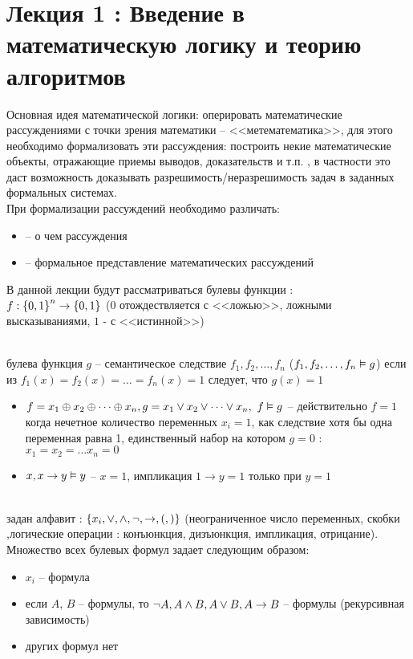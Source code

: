 \section{Лекция 1 : Введение в математическую логику и теорию алгоритмов}
\noindent Основная идея математической логики: оперировать математические рассуждениями с точки зрения математики -- <<метематематика>>, для этого необходимо формализовать эти рассуждения: построить некие математические объекты, отражающие приемы выводов, доказательств и т.п. , в частности это даст возможность доказывать разрешимость/неразрешимость задач в заданных формальных системах. \\
При формализации рассуждений необходимо различать:
\begin{itemize}
\item {} -- о чем рассуждения
\item {} -- формальное представление математических рассуждений
\end{itemize}
В данной лекции будут рассматриваться булевы функции : \\ 
$f: \left\{ 0, 1 \right\}^n \rightarrow \left\{ 0, 1 \right\}$ ($0$ отождествляется с <<ложью>>, ложными высказываниями, $1$ - с <<истинной>>)
\begin{definition}
 \\
булева функция $g$ -- семантическое следствие $f_1, f_2, \dots , f_n$ ($f_1, f_2, \dots , f_n \hm{\vDash} g $) если из $f_1(x) = f_2(x) =\dots = f_n(x) = 1$ следует, что $g(x) = 1$
\end{definition}
\begin{itemize}
\item $f = x_1 \oplus x_2 \oplus \dots \oplus x_n, g = x_1 \vee x_2 \vee \dots \vee x_n, ~ f \vDash g$ -- действительно $f=1$ когда нечетное количество переменных $x_i =1$, как следствие хотя бы одна переменная равна 1, единственный набор на котором $g = 0$ : $x_1 = x_2 = \dots x_n = 0$ 
\item $x, x \rightarrow y \vDash y$  -- $x = 1$, импликация $1 \to y = 1$ только при $y=1$
\end{itemize}
\begin{definition}  \\
задан алфавит : $\left\{ x_i, \vee, \wedge, \neg ,\rightarrow, (, ) \right\}$ (неограниченное число переменных, скобки ,логические операции : конъюнкция, дизъюнкция, импликация, отрицание). Множество всех булевых формул задает следующим образом:
\begin{itemize}
\item $x_i$ -- формула 
\item если $A$, $B$ -- формулы, то $\neg A, A \wedge B, A \vee B, A \rightarrow B$  -- формулы (рекурсивная зависимость)
\item других формул нет
\end{itemize}
\end{definition}
